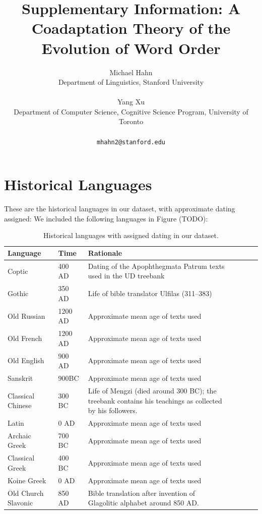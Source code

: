 \documentclass[11pt,a4paper]{article}
\title{Supplementary Information: A Coadaptation Theory of the Evolution of Word Order}
\author{Michael Hahn\\Department of Linguistics, Stanford University\\\\Yang Xu\\ Department of Computer Science, Cognitive Science Program, University of Toronto\\\\ \texttt{mhahn2@stanford.edu}}
\date{}
\begin{document}
\maketitle

\tableofcontents

\section{Historical Languages}

These are the historical languages in our dataset, with approximate dating assigned:
We included the following languages in Figure (TODO):

\begin{table}
\begin{tabular}{llp{10cm}llll}
Language & Time & Rationale \\ \hline
Coptic & 400 AD & Dating of the Apophthegmata Patrum texts used in the UD treebank\\
Gothic & 350 AD & Life of bible translator Ulfilas (311--383)\\
Old Russian & 1200 AD & Approximate mean age of texts used\\
Old French & 1200 AD  & Approximate mean age of texts used\\
Old English & 900 AD & Approximate mean age of texts used \\
Sanskrit & 900BC & Approximate mean age of texts used \\
Classical Chinese & 300 BC & Life of Mengzi (died around 300 BC); the treebank contains his teachings as collected by his followers. \\
Latin & 0 AD & Approximate mean age of texts used \\
Archaic Greek & 700 BC & Approximate mean age of texts used \\
Classical Greek & 400 BC & Approximate mean age of texts used \\
Koine Greek & 0 AD  & Approximate mean age of texts used\\
Old Church Slavonic & 850 AD &  Bible translation after invention of Glagolitic alphabet around 850 AD. \\
\end{tabular}
	\caption{Historical languages with assigned dating in our dataset.}
\end{table}
\end{document}
